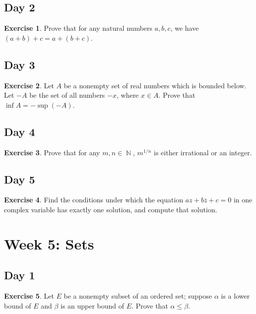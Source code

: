 \documentclass{article}
\theoremstyle{definition}
\newtheorem*{exercise}{Exercise}
\DeclareMathOperator{\N}{\mathbb{N}}
\begin{document}
\subsection*{Day 2}
\begin{exercise}
    Prove that for any natural numbers \(a,b,c\), we have \((a+b)+c=a+(b+c)\).
\end{exercise}

\subsection*{Day 3}
\begin{exercise}
    Let \(A\) be a nonempty set of real numbers which is bounded below. Let \(-A\) be the set of all numbers \(-x\), where \(x\in A\). Prove that \(\inf A=-\sup(-A)\).
\end{exercise}

\subsection*{Day 4}
\begin{exercise}
    Prove that for any \(m,n\in\N\), \(m^{1/n}\) is either irrational or an integer.
\end{exercise}

\subsection*{Day 5}
\begin{exercise}
    Find the conditions under which the equation \(az+b\bar{z}+c=0\) in one complex variable has exactly one solution, and compute that solution.
\end{exercise}

\section{Week 5: Sets}

\subsection*{Day 1}
\begin{exercise}
    Let \(E\) be a nonempty subset of an ordered set; suppose \(\alpha\) is a lower bound of \(E\) and \(\beta\) is an upper bound of \(E\). Prove that \(\alpha\leq\beta\).
\end{exercise}
\end{document}
